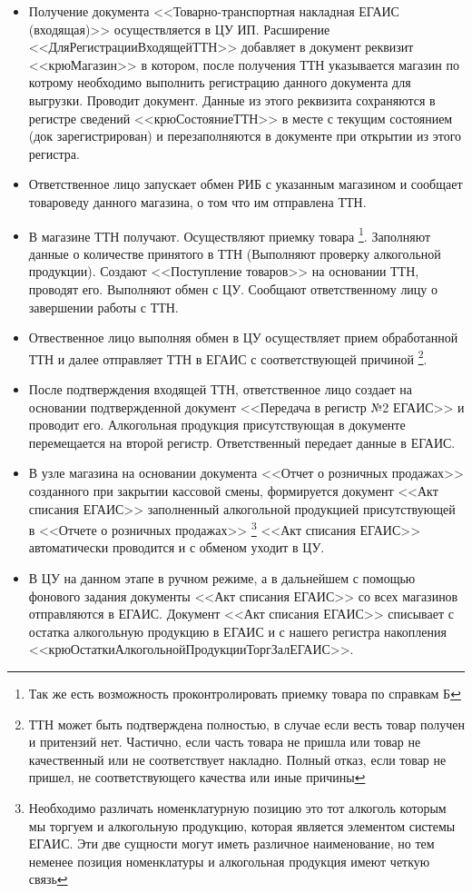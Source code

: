  \begin{itemize}
     \item Получение документа <<Товарно-транспортная накладная ЕГАИС (входящая)>> осуществляется в ЦУ ИП.
     Расширение <<ДляРегистрацииВходящейТТН>> добавляет в документ реквизит <<крюМагазин>> в котором, после получения ТТН указывается магазин по котрому необходимо выполнить регистрацию данного документа для выгрузки. Проводит документ. Данные из этого реквизита сохраняются в регистре сведений <<крюСостояниеТТН>> в месте с текущим состоянием (док зарегистрирован) и перезаполняются в документе при открытии из этого регистра.
     \item  Ответственное лицо запускает обмен РИБ с указанным магазином и сообщает товароведу данного магазина, о том что им отправлена ТТН.
     \item В магазине ТТН получают. Осуществляют приемку товара \footnote{Так же есть возможность проконтролировать приемку товара по справкам Б}. Заполняют данные о количестве принятого в ТТН (Выполняют проверку алкогольной продукции). Создают <<Поступление товаров>> на основании ТТН, проводят его. Выполняют обмен с ЦУ. Сообщают ответственному лицу о завершении работы с ТТН.
     \item Отвественное лицо выполняя обмен в ЦУ осуществляет прием обработанной ТТН и далее отправляет ТТН в ЕГАИС с соответствующей причиной \footnote{ТТН может быть подтверждена полностью, в случае если весть товар получен и притензий нет. Частично, если часть товара не пришла или товар не качественный или не соответствует накладно. Полный отказ, если товар не пришел, не соответствующего качества или иные причины}.
     \item После подтверждения входящей ТТН, ответственное лицо создает на основании подтвержденной документ <<Передача в регистр №2 ЕГАИС>>  и проводит его. Алкогольная продукция присутствующая в документе перемещается на второй регистр. Ответственный передает данные в ЕГАИС.
     \item В узле магазина  на основании документа <<Отчет о розничных продажах>> созданного при закрытии кассовой смены, формируется документ <<Акт списания ЕГАИС>> заполненный алкогольной продукцией присутствующей в <<Отчете о розничных продажах>> \footnote{Необходимо различать номенклатурную позицию это тот алкоголь которым мы торгуем и алкогольную продукцию, которая является элементом системы ЕГАИС. Эти две сущности могут иметь различное наименование, но тем неменее позиция номенклатуры и алкогольная продукция имеют четкую связь} <<Акт списания ЕГАИС>> автоматически проводится и с обменом уходит в ЦУ.
     \item В ЦУ на данном этапе в ручном режиме, а в дальнейшем с помощью фонового задания документы <<Акт списания ЕГАИС>> со всех магазинов отправляются в ЕГАИС. Документ <<Акт списания ЕГАИС>> списывает с остатка алкогольную продукцию в ЕГАИС и с нашего регистра накопления <<крюОстаткиАлкогольнойПродукцииТоргЗалЕГАИС>>.
 \end{itemize}
